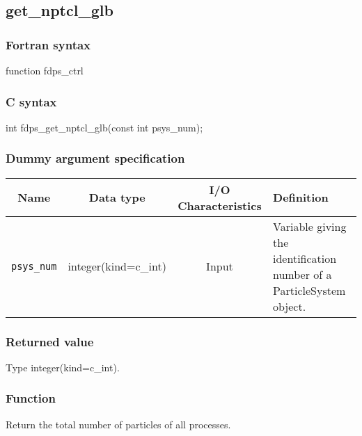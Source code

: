 \clearpage

\subsection{get\_nptcl\_glb}
\subsubsection*{Fortran syntax}
\begin{screen}
\begin{spverbatim}
function fdps_ctrl%
\end{spverbatim}
\end{screen}

\subsubsection*{C syntax}
\begin{screen}
\begin{spverbatim}
int fdps_get_nptcl_glb(const int psys_num);
\end{spverbatim}
\end{screen}

\subsubsection*{Dummy argument specification}
\begin{table}[h]
\begin{tabularx}{\linewidth}{cccX}
\toprule
\rowcolor{Snow2}
Name & Data type & I/O Characteristics & Definition \\       
\midrule
\texttt{psys\_num} & integer(kind=c\_int) & Input & Variable giving the identification number of a ParticleSystem object.\\
\bottomrule
\end{tabularx}
\end{table}

\subsubsection*{Returned value}
Type integer(kind=c\_int).

\subsubsection*{Function}
Return the total number of particles of all processes.

